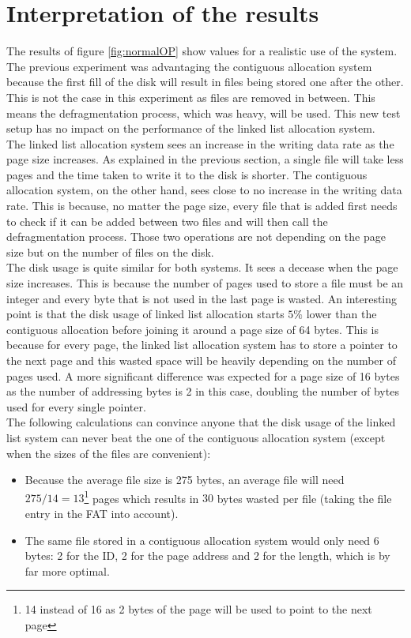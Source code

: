 \documentclass[10pt,a4paper]{ULBreport}
\begin{document}
\section{Interpretation of the results}
The results of figure \ref{fig:normalOP} show values for a realistic use of the system. The previous experiment was advantaging the contiguous allocation system because the first fill of the disk will result in files being stored one after the other. This is not the case in this experiment as files are removed in between. This means the defragmentation process, which was heavy, will be used. This new test setup has no impact on the performance of the linked list allocation system.\\
The linked list allocation system sees an increase in the writing data rate as the page size increases. As explained in the previous section, a single file will take less pages and the time taken to write it to the disk is shorter. The contiguous allocation system, on the other hand, sees close to no increase in the writing data rate. This is because, no matter the page size, every file that is added first needs to check if it can be added between two files and will then call the defragmentation process. Those two operations are not depending on the page size but on the number of files on the disk. \\
The disk usage is quite similar for both systems. It sees a decease when the page size increases. This is because the number of pages used to store a file must be an integer and every byte that is not used in the last page is wasted. An interesting point is that the disk usage of linked list allocation starts $5\%$ lower than the contiguous allocation before joining it around a page size of 64 bytes. This is because for every page, the linked list allocation system has to store a pointer to the next page and this wasted space will be heavily depending on the number of pages used. A more significant difference was expected for a page size of 16 bytes as the number of addressing bytes is 2 in this case, doubling the number of bytes used for every single pointer. \\
The following calculations can convince anyone that the disk usage of the linked list system can never beat the one of the contiguous allocation system (except when the sizes of the files are convenient):
\begin{itemize}
    \item Because the average file size is 275 bytes, an average file will need $275/14 = 13$\footnote{14 instead of 16 as 2 bytes of the page will be used to point to the next page} pages which results in $30$ bytes wasted per file (taking the file entry in the FAT into account).
    \item The same file stored in a contiguous allocation system would only need $6$ bytes: 2 for the ID, 2 for the page address and 2 for the length, which is by far more optimal. 
\end{itemize}
\end{document}

